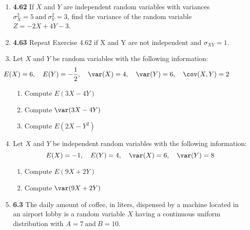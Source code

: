 \documentclass[basic, header]{nosvagor-notes}
\begin{document}
\begin{enumerate}[leftmargin=1.5em, itemsep=2em]
  \newpage %

  \item \textbf{4.62} If \(X\) and \(Y\) are independent random variables with
    variances \(\sigma^2_X = 5 ~\text{and}~ \sigma^2_Y = 3\), find the variance
    of the random variable \(Z = -2X + 4Y - 3\).

  \item \textbf{4.63} Repeat Exercise 4.62 if X and Y are not independent and
    \(\sigma_{XY} = 1\).

  \item Let \(X\) and \(Y\) be random variables with the following information:
    \[%
     \hspace{-4em} E(X) = 6, \quad E(Y) = -\frac{1}{2}, \quad \var(X) = 4, \quad \var(Y) = 6, \quad \cov(X,Y) = 2
    \]%
    \begin{enumerate}[leftmargin=1.6em]

      \item Compute \(E(3X - 4Y)\)
      \item Compute \(\var(3X - 4Y)\)
      \item Compute \(E(2X - Y^2)\)

    \end{enumerate}

  \newpage %

  \item Let \(X\) and \(Y\) be independent random variables with the following
    information:
    \[%
     E(X) = -1, \quad E(Y) = 4, \quad \var(X) = 6, \quad \var(Y) = 8
    \]%
    \begin{enumerate}[leftmargin=1.6em]

      \item Compute \(E(9X + 2Y)\)
      \item Compute \(\var(9X + 2Y)\)

    \end{enumerate}

  \item \textbf{6.3} The daily amount of coffee, in liters, dispensed by a
    machine located in an airport lobby is a random variable \(X\) having a
    continuous uniform distribution with \(A = 7 ~\text{and}~ B = 10\).


\end{enumerate}
\end{document}
